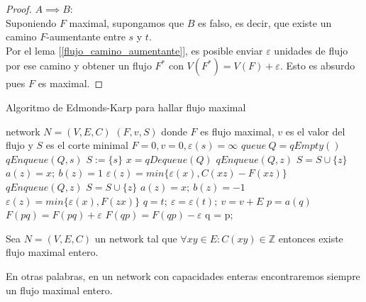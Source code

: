 \begin{proof}
  $A \implies B$:\\
  Suponiendo $F$ maximal, supongamos que $B$ es falso, es decir, que existe un camino $F$-aumentante entre $s$ y $t$.\\
  Por el lema [\ref{flujo_camino_aumentante}], es posible enviar $\varepsilon$ unidades de flujo por ese camino y obtener un flujo $F^*$ con $V({F^*}) = V(F) + \varepsilon$. Esto es absurdo pues $F$ es maximal.
\end{proof}

\begin{algorithm}
  \caption{Algoritmo de Edmonds-Karp para hallar flujo maximal}
  \begin{algorithmic}
    \Require network $N=(V,E,C)$
    \Ensure  $(F, v, S)$ donde $F$ es flujo maximal, $v$ es el valor del flujo y $S$ es el corte minimal
    \State $F = 0, v = 0, \varepsilon(s) = \infty$
    \State $queue\ Q = qEmpty()$
    \State $qEnqueue(Q,s)$
    \State $S := \{s\}$
    \State $x = qDequeue(Q)$
    \State {}
    \State $qEnqueue(Q,z)$
    \State $S = S \cup \{z\}$
    \State $a(z) = x;\ b(z) = 1$
    \State $\varepsilon(z) = min\{\varepsilon(x), C(xz) - F(xz)\}$
    \EndIf
    \EndFor
    \State {}
    \State $qEnqueue(Q,z)$
    \State $S = S \cup \{z\}$
    \State $a(z) = x;\ b(z) = -1$
    \State $\varepsilon(z) = min\{\varepsilon(x), F(zx)\}$
    \EndIf
    \EndFor
    \EndWhile
    \State
    \State $q = t;\ \varepsilon = \varepsilon(t);\ v = v+E$
    \State $p = a(q)$
    \State $F(pq) = F(pq) + \varepsilon$
    \State $F(qp) = F(qp) - \varepsilon$
    \EndIf
    \State q = p;
    \EndWhile
    \Else
    \State {}
    \EndIf
    \EndWhile
    \EndFunction
  \end{algorithmic}
\end{algorithm}

\begin{theorem}\label{integrality}
  Sea $N=(V,E,C)$ un network tal que $\forall xy \in E : C(xy) \in \mathbb{Z}$ entonces existe flujo maximal entero.
  
  En otras palabras, en un network con capacidades enteras encontraremos siempre un flujo maximal entero.
\end{theorem}

